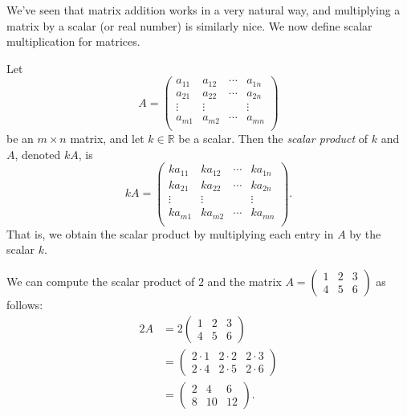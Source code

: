 \documentclass{ximera}
\begin{document}
We've seen that matrix addition works in a very natural way, and multiplying a matrix by a scalar (or real number) is similarly nice. We now define scalar multiplication for matrices.

\begin{definition}
Let
\[
A = \left(\begin{array}{cccc}
a_{11}& a_{12} & \cdots & a_{1n}\\
a_{21}& a_{22} & \cdots & a_{2n}\\
\vdots & \vdots & & \vdots\\
a_{m1}& a_{m2} & \cdots & a_{mn}\\
\end{array}\right)
\]
be an $m\times n$ matrix, and let $k\in\mathbb{R}$ be a scalar. Then the \emph{scalar product} of $k$ and $A$, denoted $kA$, is
\[
kA = \left(\begin{array}{cccc}
ka_{11}& ka_{12} & \cdots & ka_{1n}\\
ka_{21}& ka_{22} & \cdots & ka_{2n}\\
\vdots & \vdots & & \vdots\\
ka_{m1}& ka_{m2} & \cdots & ka_{mn}\\
\end{array}\right).
\]
That is, we obtain the scalar product by multiplying each entry in $A$ by the scalar $k$.
\end{definition}

\begin{example}
We can compute the scalar product of $2$ and the matrix $A = \left(\begin{array}{ccc}1&2&3\\4&5&6\end{array}\right)$ as follows:
\begin{align*}
2A &= 2\left(\begin{array}{ccc}1&2&3\\4&5&6\end{array}\right)\\
&= \left(\begin{array}{ccc}2\cdot1&2\cdot2&2\cdot3\\2\cdot4&2\cdot5&2\cdot6\end{array}\right)\\
&= \left(\begin{array}{ccc}2&4&6\\8&10&12\end{array}\right).
\end{align*}
\end{example}
\end{document}
